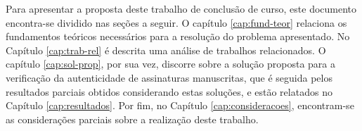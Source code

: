 
Para apresentar a proposta deste trabalho de conclusão de curso, este documento encontra-se dividido nas seções a seguir. O capítulo \ref{cap:fund-teor} relaciona os fundamentos teóricos necessários para a resolução do problema apresentado. No Capítulo \ref{cap:trab-rel} é descrita uma análise de trabalhos relacionados. O capítulo \ref{cap:sol-prop}, por sua vez, discorre sobre a solução proposta para a verificação da autenticidade de assinaturas manuscritas, que é seguida pelos resultados parciais obtidos considerando estas soluções, e estão relatados no Capítulo \ref{cap:resultados}. Por fim, no Capítulo \ref{cap:consideracoes}, encontram-se as considerações parciais sobre a realização deste trabalho.
